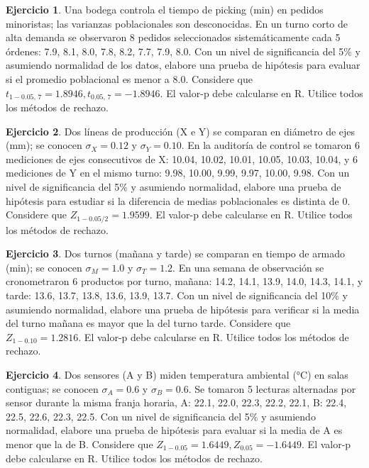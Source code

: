 \documentclass[
  11pt,
]{book}
\theoremstyle{definition}
\theoremstyle{definition}
\theoremstyle{definition}
\newtheorem{exercise}{Ejercicio}[chapter]
\theoremstyle{definition}
\theoremstyle{remark}
\begin{document}
\begin{exercise}
Una bodega controla el tiempo de picking (min) en pedidos minoristas; las varianzas poblacionales son desconocidas. En un turno corto de alta demanda se observaron 8 pedidos seleccionados sistemáticamente cada 5 órdenes: 7.9, 8.1, 8.0, 7.8, 8.2, 7.7, 7.9, 8.0. Con un nivel de significancia del 5\% y asumiendo normalidad de los datos, elabore una prueba de hipótesis para evaluar si el promedio poblacional es menor a 8.0. Considere que \(t_{1-0.05,\,7}=1.8946, t_{0.05,\,7}=-1.8946\). El valor-p debe calcularse en R. Utilice todos los métodos de rechazo.
\end{exercise}

\begin{exercise}
Dos líneas de producción (X e Y) se comparan en diámetro de ejes (mm); se conocen \(\sigma_X=0.12\) y \(\sigma_Y=0.10\). En la auditoría de control se tomaron 6 mediciones de ejes consecutivos de X: 10.04, 10.02, 10.01, 10.05, 10.03, 10.04, y 6 mediciones de Y en el mismo turno: 9.98, 10.00, 9.99, 9.97, 10.00, 9.98. Con un nivel de significancia del 5\% y asumiendo normalidad, elabore una prueba de hipótesis para estudiar si la diferencia de medias poblacionales es distinta de 0. Considere que \(Z_{1-0.05/2}=1.9599\). El valor-p debe calcularse en R. Utilice todos los métodos de rechazo.
\end{exercise}

\begin{exercise}
Dos turnos (mañana y tarde) se comparan en tiempo de armado (min); se conocen \(\sigma_M=1.0\) y \(\sigma_T=1.2\). En una semana de observación se cronometraron 6 productos por turno, mañana: 14.2, 14.1, 13.9, 14.0, 14.3, 14.1, y tarde: 13.6, 13.7, 13.8, 13.6, 13.9, 13.7. Con un nivel de significancia del 10\% y asumiendo normalidad, elabore una prueba de hipótesis para verificar si la media del turno mañana es mayor que la del turno tarde. Considere que \(Z_{1-0.10}=1.2816\). El valor-p debe calcularse en R. Utilice todos los métodos de rechazo.
\end{exercise}

\begin{exercise}
Dos sensores (A y B) miden temperatura ambiental (°C) en salas contiguas; se conocen \(\sigma_A=0.6\) y \(\sigma_B=0.6\). Se tomaron 5 lecturas alternadas por sensor durante la misma franja horaria, A: 22.1, 22.0, 22.3, 22.2, 22.1, B: 22.4, 22.5, 22.6, 22.3, 22.5. Con un nivel de significancia del 5\% y asumiendo normalidad, elabore una prueba de hipótesis para evaluar si la media de A es menor que la de B. Considere que \(Z_{1-0.05}=1.6449, Z_{0.05}=-1.6449\). El valor-p debe calcularse en R. Utilice todos los métodos de rechazo.
\end{exercise}
\end{document}
